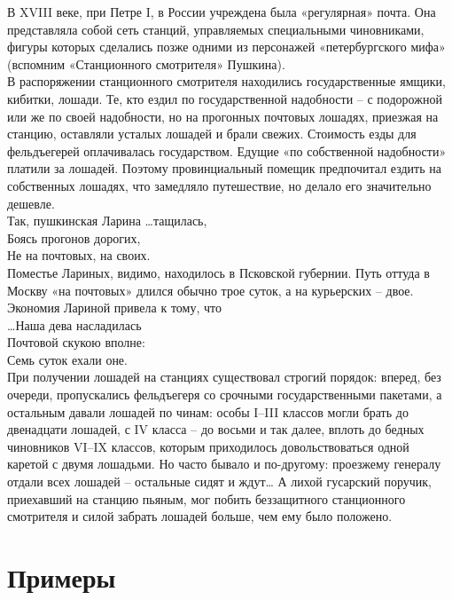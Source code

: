 \documentclass[12pt,a4paper]{article}
\begin{document}
В XVIII веке, при Петре I, в России учреждена была
«регулярная» почта. Она представляла собой сеть станций,
управляемых специальными чиновниками, фигуры которых
сделались позже одними из персонажей «петербургского
мифа» (вспомним «Станционного смотрителя» Пушкина).\\
В распоряжении станционного смотрителя находились
государственные ямщики, кибитки, лошади. Те, кто ездил по
государственной надобности – с подорожной или же по
своей надобности, но на прогонных почтовых лошадях,
приезжая на станцию, оставляли усталых лошадей и брали
свежих. Стоимость езды для фельдъегерей оплачивалась
государством. Едущие «по собственной надобности» платили
за лошадей.
Поэтому провинциальный помещик предпочитал ездить
на собственных лошадях, что замедляло путешествие, но
делало его значительно дешевле.\\
Так, пушкинская Ларина
…тащилась,\\
Боясь прогонов дорогих,\\
Не на почтовых, на своих.\\
Поместье Лариных, видимо, находилось в Псковской
губернии. Путь оттуда в Москву «на почтовых» длился
обычно трое суток, а на курьерских – двое. Экономия
Лариной привела к тому, что\\
…Наша дева насладилась\\
Почтовой скукою вполне:\\
Семь суток ехали оне.\\
При получении лошадей на станциях существовал
строгий порядок: вперед, без очереди, пропускались
фельдъегеря со срочными государственными пакетами,
а остальным давали лошадей по чинам: особы I–III классов
могли брать до двенадцати лошадей, с IV класса – до восьми
и так далее, вплоть до бедных чиновников VI–IX классов,
которым приходилось довольствоваться одной каретой
с двумя лошадьми. Но часто бывало и по-другому:
проезжему генералу отдали всех лошадей – остальные сидят
и ждут… А лихой гусарский поручик, приехавший на станцию
пьяным, мог побить беззащитного станционного смотрителя
и силой забрать лошадей больше, чем ему было положено.

\section{Примеры}
\end{document}

